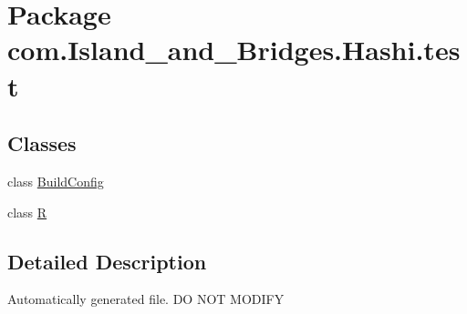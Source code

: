 \hypertarget{namespacecom_1_1_island__and___bridges_1_1_hashi_1_1test}{}\section{Package com.\+Island\+\_\+and\+\_\+\+Bridges.\+Hashi.\+test}
\label{namespacecom_1_1_island__and___bridges_1_1_hashi_1_1test}
\subsection*{Classes}
\begin{DoxyCompactItemize}
\item 
class \mbox{\hyperlink{classcom_1_1_island__and___bridges_1_1_hashi_1_1test_1_1_build_config}{Build\+Config}}
\item 
class \mbox{\hyperlink{classcom_1_1_island__and___bridges_1_1_hashi_1_1test_1_1_r}{R}}
\end{DoxyCompactItemize}


\subsection{Detailed Description}
Automatically generated file. DO N\+OT M\+O\+D\+I\+FY 